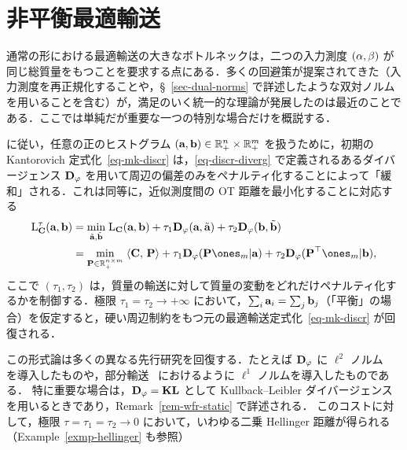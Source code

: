 \section{非平衡最適輸送}
\label{sec-unbalanced}

通常の形における最適輸送の大きなボトルネックは，二つの入力測度 $(\alpha,\beta)$ が同じ総質量をもつことを要求する点にある．多くの回避策が提案されてきた（入力測度を再正規化することや，\S~\ref{sec-dual-norms} で詳述したような双対ノルムを用いることを含む）が，満足のいく統一的な理論が発展したのは最近のことである．ここでは単純だが重要な一つの特別な場合だけを概説する．

\citet{LieroMielkeSavareLong} に従い，任意の正のヒストグラム $(\mathrm{\textbf{a}},\mathrm{\textbf{b}}) \in \mathbb{R}_+^n \times \mathbb{R}_+^m$ を扱うために，初期の Kantorovich 定式化~\eqref{eq-mk-discr} は，\eqref{eq-discr-diverg} で定義されるあるダイバージェンス $\mathrm{\textbf{D}}_\varphi$ を用いて周辺の偏差のみをペナルティ化することによって「緩和」される．これは同等に，近似測度間の OT 距離を最小化することに対応する
\begin{align}\label{eq-unbalanced-pbm}
	\MKD_{\C}^\tau(\a,\b) &= \umin{\tilde\a,\tilde\b} \MKD_{\C}(\a,\b) + \tau_1 \DivergmD_\phi(\a,\tilde \a) + \tau_2 \DivergmD_\phi(\b,\tilde\b) \\
		&= \umin{\P \in \RR_+^{n \times m}} \dotp{\C}{\P} + \tau_1\DivergmD_\phi(\P\ones_m|\a) + \tau_2\DivergmD_\phi(\P^\top\ones_m|\b),
\end{align}
ここで $(\tau_1,\tau_2)$ は，質量の輸送に対して質量の変動をどれだけペナルティ化するかを制御する．極限 $\tau_1=\tau_2 \rightarrow +\infty$ において，$\sum_i \mathrm{\textbf{a}}_i=\sum_j \mathrm{\textbf{b}}_j$（「平衡」の場合）を仮定すると，硬い周辺制約をもつ元の最適輸送定式化~\eqref{eq-mk-discr} が回復される．

この形式論は多くの異なる先行研究を回復する．たとえば $\mathrm{\textbf{D}}_\varphi$ に $\ell^2$ ノルム~\citep{benamou2003numerical} を導入したものや，部分輸送~\citep{FigalliPartial,CaffarelliMcCannPartial} におけるように $\ell^1$ ノルムを導入したものである．
%
特に重要な場合は，$\mathrm{\textbf{D}}_\varphi=\mathrm{\textbf{KL}}$ として Kullback--Leibler ダイバージェンスを用いるときであり，Remark~\ref{rem-wfr-static} で詳述される．
%
このコストに対して，極限 $\tau=\tau_1=\tau_2 \rightarrow 0$ において，いわゆる二乗 Hellinger 距離が得られる（Example~\ref{exmp-hellinger} も参照）

